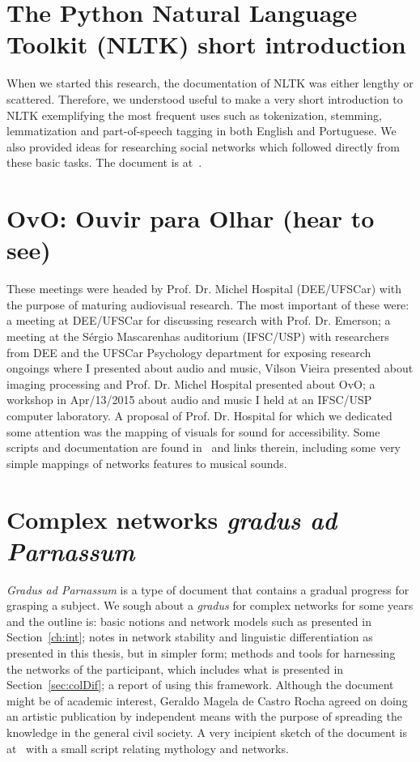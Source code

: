 \begin{apendicesenv}
\section{The Python Natural Language Toolkit (NLTK) short introduction}
When we started this research, the documentation of NLTK was either lengthy or
scattered.
Therefore, we understood useful to make a very short introduction to NLTK
exemplifying the most frequent uses such as tokenization, stemming, lemmatization and
part-of-speech tagging in both English and Portuguese.
We also provided ideas for researching social networks which followed directly from
these basic tasks.
The document is at~\cite{trabNLTK}.


\section{OvO: Ouvir para Olhar (hear to see)}
These meetings were headed by Prof. Dr. Michel Hospital (DEE/UFSCar)
with the purpose of maturing audiovisual research.
The most important of these were: a meeting at DEE/UFSCar for discussing research with Prof. Dr. Emerson;
a meeting at the Sérgio Mascarenhas auditorium (IFSC/USP) with researchers from DEE and the UFSCar Psychology department
for exposing research ongoings where I presented about audio and music, Vilson Vieira presented about imaging processing
and Prof. Dr. Michel Hospital presented about OvO;
a workshop in Apr/13/2015 about audio and music I held at an IFSC/USP computer laboratory.
A proposal of Prof. Dr. Hospital for which we dedicated some attention was the
mapping of visuals for sound for accessibility.
Some scripts and documentation are found in~\cite{ovo} and links therein,
including some very simple mappings of networks features to musical sounds.

\section{Complex networks \emph{gradus ad Parnassum}}
\emph{Gradus ad Parnassum} is a type of document that contains a gradual progress for grasping a subject.
We sough about a \emph{gradus} for complex networks for some years and the outline is:
basic notions and network models such as presented in Section~\ref{ch:int};
notes in network stability and linguistic differentiation as presented in this thesis, but in simpler form;
methods and tools for harnessing the networks of the participant, which includes what is presented in Section~\ref{sec:colDif};
a report of using this framework.
Although the document might be of academic interest,
Geraldo Magela de Castro Rocha agreed on doing an artistic publication by independent means
with the purpose of spreading the knowledge in the general civil society.
A very incipient sketch of the document is at~\cite{gradus}
with a small script relating mythology and networks.


\end{apendicesenv}
